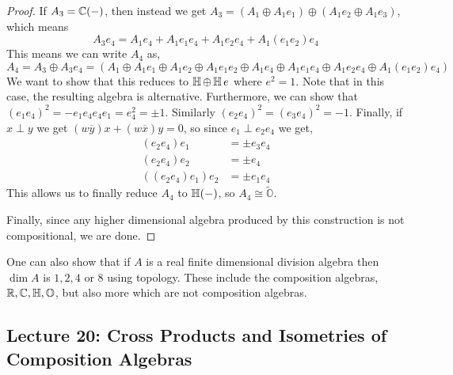\begin{proof}
    If $A_3 = \operatorname{\mathbb{C}}(-)$, then instead we get $A_3 = (A_1\oplus A_1e_1)\oplus(A_1e_2\oplus A_1e_3)$, which means 
    \[A_3e_4 = A_1e_4+A_1e_1e_4+A_1e_2e_4+A_1(e_1e_2)e_4\] This means we can write $A_4$ as,
    \[A_4 = A_3\oplus A_3e_4 = (A_1\oplus A_1e_1 \oplus A_1e_2\oplus A_1e_1e_2 \oplus A_1e_4 \oplus A_1e_1e_4\oplus A_1 e_2e_4\oplus A_1(e_1e_2)e_4)\]
    We want to show that this reduces to $\operatorname{\mathbb{H}}\oplus \operatorname{\mathbb{H}} e$ where $e^2=1$.
    Note that in this case, the resulting algebra is alternative. Furthermore, we can show that $(e_1e_4)^2 = -e_1e_4e_4e_1=e_4^2=\pm 1$. Similarly $(e_2e_4)^2=(e_3e_4)^2=-1$. Finally, if $x\perp y$ we get $(w\overline{y})x+(w\overline{x})y=0$, so since $e_1\perp e_2e_4$ we get,
    \begin{align*}
    (e_2e_4)e_1 &= \pm e_3e_4\\
    (e_2e_4)e_2&=\pm e_4\\
    ((e_2e_4)e_1)e_2&=\pm e_1e_4
    \end{align*}
    This allows us to finally reduce $A_4$ to $\operatorname{\mathbb{H}}(-)$, so $A_4\cong \tilde{\mathbb{O}}$.

    Finally, since any higher dimensional algebra produced by this construction is not compositional, we are done.
\end{proof}
\begin{remark*}
    One can also show that if $A$ is a real finite dimensional division algebra then $\dim A$ is $1,2,4$ or $8$ using topology. These include the composition algebras, $\operatorname{\mathbb{R}},\operatorname{\mathbb{C}},\operatorname{\mathbb{H}},\mathbb{O}$, but also more which are not composition algebras. 
\end{remark*}

\subsection{Lecture 20: Cross Products and Isometries of Composition Algebras}
